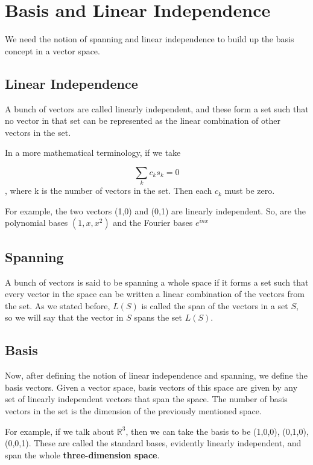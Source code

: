 \section{Basis and Linear Independence}

We need the notion of spanning and linear independence to build up the basis concept in a vector space. 

\subsection{Linear Independence}

A bunch of vectors are called linearly independent, and these form a set such that no vector in that set can be represented as the linear combination of other vectors in the set. 

In a more mathematical terminology, if we take

$$\sum_kc_ks_k=0$$, where k is the number of vectors in the set. Then each $c_k$ must be zero. 

For example, the two vectors (1,0) and (0,1) are linearly independent. So, are the polynomial bases $(1, x, x^2)$ and the Fourier bases $e^{inx}$

\subsection{Spanning}

A bunch of vectors is said to be spanning a whole space if it forms a set such that every vector in the space can be written a linear combination of the vectors from the set. As we stated before, $L(S)$ is called the span of the vectors in a set $S$, so we will say that the vector in $S$ spans the set $L(S)$.


\subsection{Basis}

Now, after defining the notion of linear independence and spanning, we define the basis vectors. Given a vector space, basis vectors of this space are given by any set of linearly independent vectors that span the space. The number of basis vectors in the set is the dimension of the previously mentioned space.

For example, if we talk about $\mathbb{R}^3$, then we can take the basis to be (1,0,0), (0,1,0), (0,0,1). These are called the standard bases, evidently linearly independent, and span the whole \textbf{three-dimension space}.


